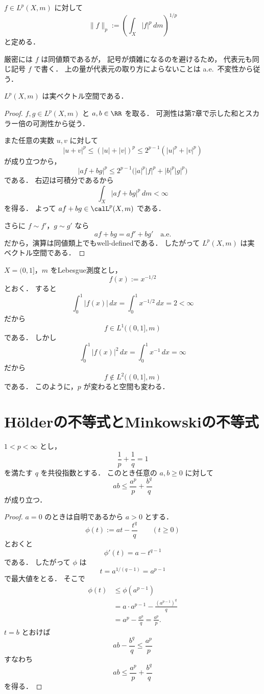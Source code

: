 \begin{definition}
$f\in L^p(X,m)$ に対して
\[
\|f\|_p
:=
\left(\int_X |f|^p\,dm\right)^{1/p}
\]
と定める．
\end{definition}

\begin{remark}
厳密には $f$ は同値類であるが，
記号が煩雑になるのを避けるため，
代表元も同じ記号 $f$ で書く．
上の量が代表元の取り方によらないことは a.e.\ 不変性から従う．
\end{remark}

\begin{proposition}
$L^p(X,m)$ は実ベクトル空間である．
\end{proposition}
\begin{proof}
$f,g\in L^p(X,m)$ と $a,b\in\RR$ を取る．
可測性は第7章で示した和とスカラー倍の可測性から従う．

また任意の実数 $u,v$ に対して
\[
|u+v|^p\le (|u|+|v|)^p\le 2^{p-1}(|u|^p+|v|^p)
\]
が成り立つから，
\[
|af+bg|^p
\le
2^{p-1}\bigl(|a|^p|f|^p+|b|^p|g|^p\bigr)
\]
である．
右辺は可積分であるから
\[
\int_X |af+bg|^p\,dm<\infty
\]
を得る．
よって $af+bg\in \calL^p(X,m)$ である．

さらに $f\sim f'$，$g\sim g'$ なら
\[
af+bg=af'+bg'
\quad \text{a.e.}
\]
だから，演算は同値類上でもwell-definedである．
したがって $L^p(X,m)$ は実ベクトル空間である．
\end{proof}

\begin{example}
$X=(0,1]$，$m$ をLebesgue測度とし，
\[
f(x):=x^{-1/2}
\]
とおく．
すると
\[
\int_0^1 |f(x)|\,dx=\int_0^1 x^{-1/2}\,dx=2<\infty
\]
だから
\[
f\in L^1((0,1],m)
\]
である．
しかし
\[
\int_0^1 |f(x)|^2\,dx=\int_0^1 x^{-1}\,dx=\infty
\]
だから
\[
f\notin L^2((0,1],m)
\]
である．
このように，$p$ が変わると空間も変わる．
\end{example}

\section{Hölderの不等式とMinkowskiの不等式}

\begin{lemma}[Youngの不等式]
$1<p<\infty$ とし，
\[
\frac{1}{p}+\frac{1}{q}=1
\]
を満たす $q$ を共役指数とする．
このとき任意の $a,b\ge 0$ に対して
\[
ab\le \frac{a^p}{p}+\frac{b^q}{q}
\]
が成り立つ．
\end{lemma}
\begin{proof}
$a=0$ のときは自明であるから $a>0$ とする．
\[
\phi(t):=at-\frac{t^q}{q}
\qquad (t\ge 0)
\]
とおくと
\[
\phi'(t)=a-t^{q-1}
\]
である．
したがって $\phi$ は
\[
t=a^{1/(q-1)}=a^{p-1}
\]
で最大値をとる．
そこで
\begin{align*}
\phi(t)
&\le \phi(a^{p-1}) \\
&= a\cdot a^{p-1}-\frac{(a^{p-1})^q}{q} \\
&= a^p-\frac{a^p}{q}
=\frac{a^p}{p}.
\end{align*}
$t=b$ とおけば
\[
ab-\frac{b^q}{q}\le \frac{a^p}{p}
\]
すなわち
\[
ab\le \frac{a^p}{p}+\frac{b^q}{q}
\]
を得る．
\end{proof}

